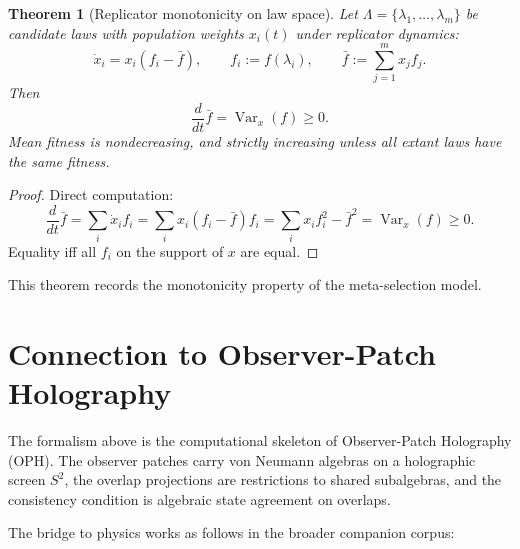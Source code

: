\documentclass[11pt]{article}
\newtheorem{theorem}{Theorem}[section]
\theoremstyle{remark}
\theoremstyle{plain}
\begin{document}
\begin{theorem}[Replicator monotonicity on law space]\label{thm:replicator}
Let $\Lambda=\{\lambda_1,\dots,\lambda_m\}$ be candidate laws with population weights $x_i(t)$ under replicator dynamics:
\[
\dot{x}_i = x_i(f_i - \bar{f}),
\qquad
f_i := f(\lambda_i),
\qquad
\bar{f} := \sum_{j=1}^m x_j f_j.
\]
Then
\[
\frac{d}{dt}\bar{f} = \operatorname{Var}_x(f) \ge 0.
\]
Mean fitness is nondecreasing, and strictly increasing unless all extant laws have the same fitness.
\end{theorem}

\begin{proof}
Direct computation:
\[
\frac{d}{dt}\bar{f}
=
\sum_i \dot{x}_i f_i
=
\sum_i x_i(f_i - \bar{f})f_i
=
\sum_i x_i f_i^2 - \bar{f}^2
=
\operatorname{Var}_x(f) \ge 0.
\]
Equality iff all $f_i$ on the support of $x$ are equal.
\end{proof}

This theorem records the monotonicity property of the meta-selection model.


\section{Connection to Observer-Patch Holography}

The formalism above is the computational skeleton of Observer-Patch Holography (OPH). The observer patches carry von Neumann algebras on a holographic screen $S^2$, the overlap projections are restrictions to shared subalgebras, and the consistency condition is algebraic state agreement on overlaps.

The bridge to physics works as follows in the broader companion corpus:
\end{document}
